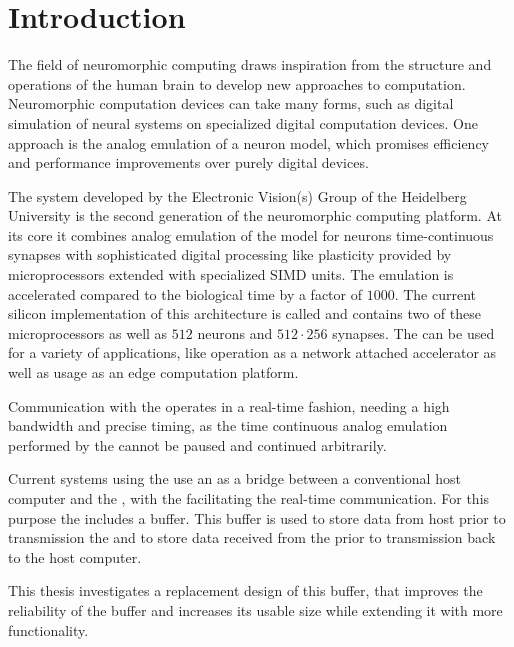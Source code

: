\section{Introduction}
The field of neuromorphic computing draws inspiration from the structure and operations of the human brain to develop new approaches to computation. Neuromorphic computation devices can take many forms, such as digital simulation of neural systems on specialized digital computation devices\autocite{ref:spinnaker}. One approach is the analog emulation of a neuron model, which promises efficiency and performance improvements over purely digital devices.

The \BSSTwo{} system developed by the Electronic Vision(s) Group of the Heidelberg University is the second generation of the \BSS{} neuromorphic computing platform. At its core it combines analog emulation of the \AdEx{}\autocite{ref:adex} model for neurons time-continuous synapses with sophisticated digital processing like plasticity provided by microprocessors extended with specialized SIMD units. The emulation is accelerated compared to the biological time by a factor of $\num{1000}$. The current silicon implementation of this architecture is called \HICANNX{} and contains two of these microprocessors as well as $\num{512}$ neurons and $\num{512} · \num{256}$ synapses. The \HICANNX{} \ASIC{} can be used for a variety of applications, like operation as a network attached accelerator\autocite{ref:network_accelerator} as well as usage as an edge computation platform\autocite{ref:mobile_system}.

Communication with the \HICANNX{} \ASIC{} operates in a real-time fashion, needing a high bandwidth and precise timing, as the time continuous analog emulation performed by the \ASIC{} cannot be paused and continued arbitrarily.

Current systems using the \HICANNX{} \ASIC{} use an \FPGA{} as a bridge between a conventional host computer and the \ASIC{}, with the \FPGA{} facilitating the real-time communication. For this purpose the \FPGA{} includes a buffer. This buffer is used to store data from host prior to transmission the \ASIC{} and to store data received from the \ASIC{} prior to transmission back to the host computer.

This thesis investigates a replacement design of this buffer, that improves the reliability of the buffer and increases its usable size while extending it with more functionality.
